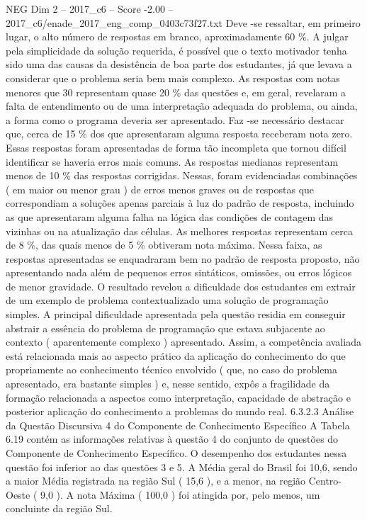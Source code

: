 \begin{textsample}{NEG Dim 2 – 2017\_c6 – Score -2.00 – 2017\_c6/enade\_2017\_eng\_comp\_0403c73f27.txt}
Deve -se ressaltar, em primeiro lugar, o alto número de respostas em branco, aproximadamente 60 \%.
A julgar pela simplicidade da solução requerida, é possível que o texto motivador tenha sido uma das causas da desistência de boa parte dos estudantes, já que levava a considerar que o problema seria bem mais complexo.
As respostas com notas menores que 30 representam quase 20 \% das questões e, em geral, revelaram a falta de entendimento ou de uma interpretação adequada do problema, ou ainda, a forma como o programa deveria ser apresentado.
Faz -se necessário destacar que, cerca de 15 \% dos que apresentaram alguma resposta receberam nota zero.
Essas respostas foram apresentadas de forma tão incompleta que tornou difícil identificar se haveria erros mais comuns.
As respostas medianas representam menos de 10 \% das respostas corrigidas.
Nessas, foram evidenciadas combinações ( em maior ou menor grau ) de erros menos graves ou de respostas que correspondiam a soluções apenas parciais à luz do padrão de resposta, incluindo as que apresentaram alguma falha na lógica das condições de contagem das vizinhas ou na atualização das células.
As melhores respostas representam cerca de 8 \%, das quais menos de 5 \% obtiveram nota máxima.
Nessa faixa, as respostas apresentadas se enquadraram bem no padrão de resposta proposto, não apresentando nada além de pequenos erros sintáticos, omissões, ou erros lógicos de menor gravidade.
O resultado revelou a dificuldade dos estudantes em extrair de um exemplo de problema contextualizado uma solução de programação simples.
A principal dificuldade apresentada pela questão residia em conseguir abstrair a essência do problema de programação que estava subjacente ao contexto ( aparentemente complexo ) apresentado.
Assim, a competência avaliada está relacionada mais ao aspecto prático da aplicação do conhecimento do que propriamente ao conhecimento técnico envolvido ( que, no caso do problema apresentado, era bastante simples ) e, nesse sentido, expôs a fragilidade da formação relacionada a aspectos como interpretação, capacidade de abstração e posterior aplicação do conhecimento a problemas do mundo real. 6.3.2.3 Análise da Questão Discursiva 4 do Componente de Conhecimento Específico A Tabela 6.19 contém as informações relativas à questão 4 do conjunto de questões do Componente de Conhecimento Específico.
O desempenho dos estudantes nessa questão foi inferior ao das questões 3 e 5.
A Média geral do Brasil foi 10,6, sendo a maior Média registrada na região Sul ( 15,6 ), e a menor, na região Centro-Oeste ( 9,0 ).
A nota Máxima ( 100,0 ) foi atingida por, pelo menos, um concluinte da região Sul.

\end{textsample}

